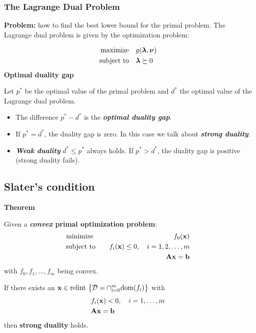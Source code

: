 \subsubsection{The Lagrange Dual Problem}

 \textbf{Problem:} how to find the best lower bound for the primal problem. The Lagrange dual problem is given by the optimization problem:
  
  \begin{align*}
    \text{maximize} \quad & g(\bm{\mathrm{\lambda}}, \bm{\mathrm{\nu}}) \\
    \text{subject to} \quad & \bm{\mathrm{\lambda}} \succeq 0
  \end{align*}
  \textbf{Optimal duality gap}

Let  ${p}^*$ be the optimal value of the primal problem and ${d}^*$ the optimal value of the Lagrange dual problem. 
    
    \begin{itemize}
      \item The difference $p^*-d^*$ is the \textbf{\emph{optimal duality gap}}.
      \item If $p^*=d^*$, the duality gap is zero. In this case we talk about \textbf{\emph{strong duality}}.
      \item \textbf{\emph{Weak duality}} $d^*\leq p^*$ always holds. If $p^*> d^*$, the duality gap is positive (strong duality fails).
     \end{itemize}
 
\subsection{Slater's condition}

\textbf{Theorem}

    Given a \textbf{\emph{convex} primal optimization problem}:
    \begin{eqnarray*}
      \mbox{minimize~}  & & \quad f_0(\bm{\mathrm{x}}) \\
      \mbox{subject to} & & \quad f_i(\bm{\mathrm{x}}) \leq 0, \quad i=1,2,\dots, m \\
                        & & \quad \mathbf{A} \bm{\mathrm{x}} = \bm{\mathrm{b}}
    \end{eqnarray*}
    with $f_0, f_1, \ldots, f_m$ being convex. 

    If there exists an $\bm{\mathrm{x}} \in \text{relint}~\big\{\mathcal{D} = \cap_{i=0}^m \text{dom}(f_i) \big\}$ with
    \begin{align*}
      & f_i(\bm{\mathrm{x}}) < 0, \quad i=1,\dots,m \\
      & \mathbf{A}\bm{\mathrm{x}} = \bm{\mathrm{b}} 
    \end{align*}
    then \textbf{strong duality} holds.
   
